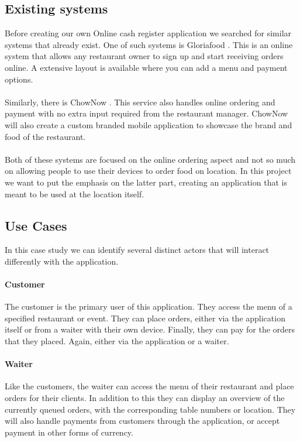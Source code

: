 \documentclass[12pt]{article}
\begin{document}
\begin{multicols}{2}
\subsection{Existing systems}
Before creating our own Online cash register application we searched for similar systems that already exist. One of such systems is Gloriafood \cite{Gloriafood:online}. This is an online system that allows any restaurant owner to sign up and start receiving orders online. A extensive layout is available where you can add a menu and payment options.
\\\\
Similarly, there is ChowNow \cite{Chownow:online}. This service also handles online ordering and payment with no extra input required from the restaurant manager. ChowNow will also create a custom branded mobile application to showcase the brand and food of the restaurant.
\\\\
Both of these systems are focused on the online ordering aspect and not so much on allowing people to use their devices to order food on location. In this project we want to put the emphasis on the latter part, creating an application that is meant to be used at the location itself.
\subsection{Use Cases}
In this case study we can identify several distinct actors that will interact differently with the application.
\paragraph{Customer}
The customer is the primary user of this application. They access the menu of a specified restaurant or event. They can place orders, either via the application itself or from a waiter with their own device. Finally, they can pay for the orders that they placed. Again, either via the application or a waiter.
\paragraph{Waiter}
Like the customers, the waiter can access the menu of their restaurant and place orders for their clients. In addition to this they can display an overview of the currently queued orders, with the corresponding table numbers or location. They will also handle payments from customers through the application, or accept payment in other forms of currency.

\end{multicols}
\end{document}
